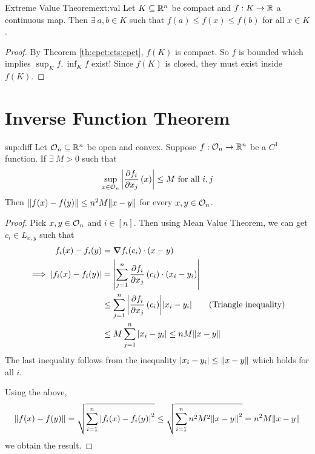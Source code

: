 \documentclass[../Analysis-3.tex]{subfiles}
\begin{document}
\begin{Thm}{Extreme Value Theorem}{ext:val}
  Let $ K \subseteq \mathbb{R}^n $ be compact and $ f:K \to \mathbb{R} $ a continuous map. Then $\exists\ a,b \in K $ such that $ f(a) \leq f(x) \leq f(b) $ for all $ x \in K $.
\end{Thm}

\begin{proof}
  By Theorem \ref{th:cpct:cts:cpct}, $ f(K) $ is compact. So $ f $ is bounded which implies $ \displaystyle \sup_K f, \inf_K f $ exist! Since $ f(K) $ is closed, they must exist inside $ f(K) $.
\end{proof}

\section{Inverse Function Theorem}

\begin{Lem}{}{sup:diff}
  Let $ \mathcal{O}_{n} \subseteq \mathbb{R}^n $ be open and convex. Suppose $ f:\mathcal{O}_{n} \to \mathbb{R}^n $ be a $ C^1 $ function. If $ \exists\ M > 0 $ such that
  \[ \sup_{x \in \mathcal{O}_{n}} \abs{\pdv{f_i}{x_j}\left( x \right)} \leq M \text{ for all } i, j \]
  Then $ \norm{f(x) - f(y)} \leq n^2 M\norm{x-y} $ for every $ x, y \in \mathcal{O}_{n} $.
\end{Lem}

\begin{proof}
  Pick $ x, y \in \mathcal{O}_{n} $ and $ i \in [n] $. Then using Mean Value Theorem, we can get $ c_i \in L_{x, y} $ such that
  \begin{align*}
    f_i(x) - f_i(y)                & = \grad f_i (c_i) \cdot (x - y)                                                                     \\
    \implies \abs{f_i(x) - f_i(y)} & = \abs{\sum_{j=1}^{n} \pdv{f_i}{x_j}\left( c_i \right) \cdot (x_i - y_i)}                           \\
                                   & \leq \sum_{j=1}^{n} \abs{\pdv{f_i}{x_j}\left( c_i \right)}\abs{x_i - y_i} \tag{Triangle inequality} \\
                                   & \leq M \sum_{j=1}^{n} \abs{x_i - y_i} \leq nM \norm{x-y}
  \end{align*}
  The last inequality follows from the inequality $ \abs{x_i-y_i} \leq \norm{x-y} $ which holds for all $ i $.

  Using the above, \[ \norm{f(x) - f(y)} = \sqrt{\sum_{i=1}^{n} \abs{f_i(x) - f_i(y)}^2} \leq \sqrt{\sum_{i=1}^{n} n^2M^2\norm{x-y}^2 } = n^2 M\norm{x-y} \]
  we obtain the result.
\end{proof}
\end{document}
